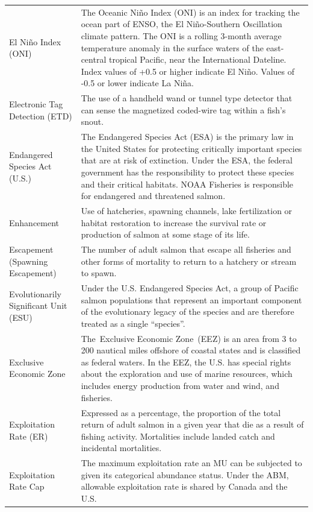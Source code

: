\documentclass[
  letterpaper,
  DIV=11,
  numbers=noendperiod]{scrartcl}
\begin{document}
\begin{table}
\begin{tabular*}{\linewidth}{@{\extracolsep{\fill}}ll}
El Niño Index (ONI) & The Oceanic Niño Index (ONI) is an index for tracking the ocean part of ENSO, the El Niño-Southern Oscillation climate pattern. The ONI is a rolling 3-month average temperature anomaly in the surface waters of the east-central tropical Pacific, near the International Dateline. Index values of +0.5 or higher indicate El Niño. Values of -0.5 or lower indicate La Niña. \\ 
Electronic Tag Detection (ETD) & The use of a handheld wand or tunnel type detector that can sense the magnetized coded-wire tag within a fish's snout. \\ 
Endangered Species Act  (U.S.) & The Endangered Species Act (ESA) is the primary law in the United States for protecting critically important species that are at risk of extinction. Under the ESA, the federal government has the responsibility to protect these species and their critical habitats. NOAA Fisheries is responsible for endangered and threatened salmon. \\ 
Enhancement & Use of hatcheries, spawning channels, lake fertilization or habitat restoration to increase the survival rate or production of salmon at some stage of its life. \\ 
Escapement (Spawning Escapement) & The number of adult salmon that escape all fisheries and other forms of mortality to return to a hatchery or stream to spawn. \\ 
Evolutionarily Significant Unit (ESU) & Under the U.S. Endangered Species Act, a group of Pacific salmon populations that represent an important component of the evolutionary legacy of the species and are therefore treated as a single “species”. \\ 
Exclusive Economic Zone & The Exclusive Economic Zone (EEZ) is an area from 3 to 200 nautical miles offshore of coastal states and is classified as federal waters. In the EEZ, the U.S. has special rights about the exploration and use of marine resources, which includes energy production from water and wind, and fisheries. \\ 
Exploitation Rate (ER) & Expressed as a percentage, the proportion of the total return of adult salmon in a given year that die as a result of fishing activity. Mortalities include landed catch and incidental mortalities. \\ 
Exploitation Rate Cap & The maximum exploitation rate an MU can be subjected to given its categorical abundance status. Under the ABM, allowable exploitation rate is shared by Canada and the U.S. \\ 

\end{tabular*}
\end{table}
\end{document}
